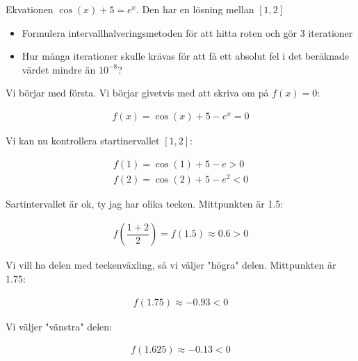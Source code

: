 \noindent Ekvationen $\cos(x)+5=e^x$. Den har en lösning mellan $[1,2]$
\begin{itemize}
  \item Formulera intervallhalveringsmetoden för att hitta roten och gör 3 iterationer
  \item Hur många iterationer skulle krävas för att få ett absolut fel i det beräknade värdet mindre än $10^{-8}$?
\end{itemize}
\par\bigskip
\noindent Vi börjar med första. Vi börjar givetvis med att skriva om på $f(x) = 0$:


\begin{equation*}
  \begin{gathered}
    f(x) = \cos(x)+5-e^x = 0
  \end{gathered}
\end{equation*}
\par\bigskip
\noindent Vi kan nu kontrollera startinervallet $[1,2]$:
\par\bigskip

\begin{equation*}
  \begin{gathered}
    f(1) = \cos(1)+5-e>0\\
    f(2) = \cos(2)+5-e^2<0
  \end{gathered}
\end{equation*}
\par\bigskip
\noindent Sartintervallet är ok, ty jag har olika tecken. Mittpunkten är 1.5:
\par\bigskip

\begin{equation*}
  \begin{gathered}
    f(\dfrac{1+2}{2})=f(1.5)\approx 0.6>0
  \end{gathered}
\end{equation*}
\par\bigskip
\noindent Vi vill ha delen med teckenväxling, så vi väljer "högra" delen. Mittpunkten är 1.75:
\par\bigskip


\begin{equation*}
  \begin{gathered}
    f(1.75)\approx -0.93<0
  \end{gathered}
\end{equation*}

\noindent Vi väljer "vänstra" delen:

\begin{equation*}
  \begin{gathered}
    f(1.625)\approx -0.13<0
  \end{gathered}
\end{equation*}

